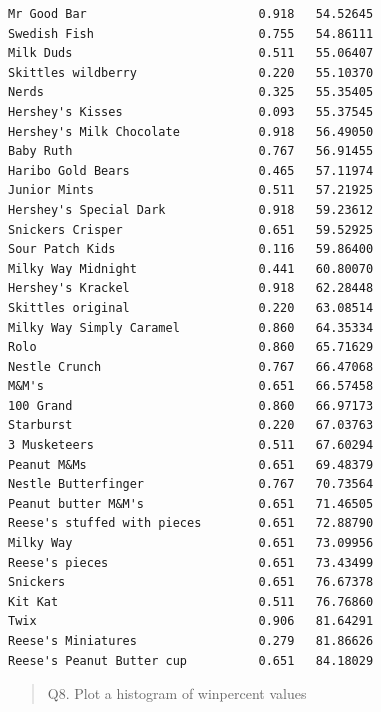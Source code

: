 \documentclass[
  letterpaper,
  DIV=11,
  numbers=noendperiod]{scrartcl}
\newenvironment{Shaded}{\begin{snugshade}}{\end{snugshade}}
\newcommand{\FunctionTok}[1]{\textcolor[rgb]{0.28,0.35,0.67}{#1}}
\newcommand{\NormalTok}[1]{\textcolor[rgb]{0.00,0.23,0.31}{#1}}
\newcommand{\SpecialCharTok}[1]{\textcolor[rgb]{0.37,0.37,0.37}{#1}}
\begin{document}
\begin{verbatim}
Mr Good Bar                        0.918   54.52645
Swedish Fish                       0.755   54.86111
Milk Duds                          0.511   55.06407
Skittles wildberry                 0.220   55.10370
Nerds                              0.325   55.35405
Hershey's Kisses                   0.093   55.37545
Hershey's Milk Chocolate           0.918   56.49050
Baby Ruth                          0.767   56.91455
Haribo Gold Bears                  0.465   57.11974
Junior Mints                       0.511   57.21925
Hershey's Special Dark             0.918   59.23612
Snickers Crisper                   0.651   59.52925
Sour Patch Kids                    0.116   59.86400
Milky Way Midnight                 0.441   60.80070
Hershey's Krackel                  0.918   62.28448
Skittles original                  0.220   63.08514
Milky Way Simply Caramel           0.860   64.35334
Rolo                               0.860   65.71629
Nestle Crunch                      0.767   66.47068
M&M's                              0.651   66.57458
100 Grand                          0.860   66.97173
Starburst                          0.220   67.03763
3 Musketeers                       0.511   67.60294
Peanut M&Ms                        0.651   69.48379
Nestle Butterfinger                0.767   70.73564
Peanut butter M&M's                0.651   71.46505
Reese's stuffed with pieces        0.651   72.88790
Milky Way                          0.651   73.09956
Reese's pieces                     0.651   73.43499
Snickers                           0.651   76.67378
Kit Kat                            0.511   76.76860
Twix                               0.906   81.64291
Reese's Miniatures                 0.279   81.86626
Reese's Peanut Butter cup          0.651   84.18029
\end{verbatim}

\begin{quote}
Q8. Plot a histogram of winpercent values
\end{quote}

\begin{Shaded}
\end{Shaded}
\end{document}

